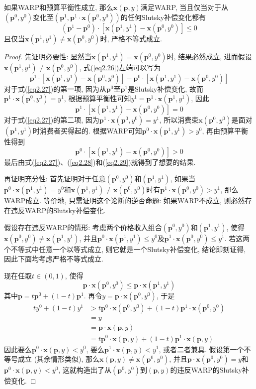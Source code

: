 \documentclass[cn, 12pt, math=mtpro2, bibstyle=apa, blue]{elegantbook}
\newcommand{\p}{\mathbf{p}}
\newcommand{\x}{\mathbf{x}}
\begin{document}
\begin{theorem}\label{thm:thm2.3}
  如果WARP和预算平衡性成立, 那么$\x(\p,y)$满足WARP, 当且仅当对于从$(\p^0,y^0)$变化至$(\p^1,\p^1\cdot \x(\p^0,y^0))$的任何Slutsky补偿变化都有
  \begin{equation}\label{eq2.26}
    (\p^1-\p^0)\cdot[\x(\p^1,y^1)-\x(\p^0,y^0)]\le0
  \end{equation}
  且仅当$\x(\p^1,y^1)\neq \x(\p^0,y^0)$时, 严格不等式成立.
\end{theorem}
\begin{proof}
  先证明必要性: 显然当$\x(\p^1,y^1)=\x(\p^0,y^0)$时, 结果必然成立, 进而假设$\x(\p^1,y^1)\neq \x(\p^0,y^0)$, 式(\ref{eq2.26})左端可以写为
  \begin{equation}\label{eq2.27}
    \p^1\cdot[\x(\p^1,y^1)-\x(\p^0,y^0)]-\p^0\cdot[\x(\p^1,y^1)-\x(\p^0,y^0)]
  \end{equation}
  对于式(\ref{eq2.27})的第一项, 因为从$\p^0$至$\p^1$是Slutsky补偿变化, 故而$\p^1\cdot\x(\p^0,y^0)=y^1$, 根据预算平衡性可知$y^1=\p^1\cdot\x(\p^1,y^1)$, 因此
  \begin{equation}\label{eq2.28}
    \p^1\cdot[\x(\p^1,y^1)-\x(\p^0,y^0)]=0
  \end{equation}
  对于式(\ref{eq2.27})的第二项, 因为$\p^1\cdot\x(\p^0,y^0)=y^1$, 所以消费束$\x(\p^0,y^0)$是面对$(\p^1,y^1)$时消费者买得起的. 根据WARP可知$\p^0\cdot\x(\p^1,y^1)>y^0$, 再由预算平衡性得到
  \begin{equation}\label{eq2.29}
    \p^0\cdot[\x(\p^1,y^1)-\x(\p^0,y^0)]>0
  \end{equation}
  最后由式(\ref{eq2.27})、(\ref{eq2.28})和(\ref{eq2.29})就得到了想要的结果.

  再证明充分性: 首先证明对于任意$(\p^0,y^0)$和$(\p^1,y^1)$, 如果当$\p^0\cdot\x(\p^1,y^1)=y^0$和$\x(\p^1,y^1)\neq \x(\p^0,y^0)$时有$\p^1\cdot\x(\p^0,y^0)>y^1$, 那么WARP成立. 等价地, 只需证明这个论断的逆否命题: 如果WARP不成立, 则必然存在违反WARP的Slutsky补偿变化.

   假设存在违反WARP的情形: 考虑两个价格收入组合$(\p^0,y^0)$和$(\p^1,y^1)$, 使得$\x(\p^0,y^0)\neq \x(\p^1,y^1)$, 并且$\p^0\cdot\x(\p^1,y^1)\leq y^0$及$\p^1\cdot\x(\p^0,y^0)\leq y^1$. 若这两个不等式中任意一个以等式成立, 则它就是一个Slutsky补偿变化, 结论即刻证得, 因此下面均考虑严格不等式成立.

  现在任取$t\in(0,1)$, 使得
  $$\p\cdot\x(\p^0,y^0)\leq \p\cdot\x(\p^1,y^1)$$
  其中$\p=t\p^0+(1-t)\p^1$. 再令$y=\p\cdot\x(\p^0,y^0)$, 于是
  \begin{align*}
  ty^0+(1-t)y^1&>t\p^0\cdot\x(\p^0,y^0)+(1-t)\p^1\cdot\x(\p^0,y^0) \\
  &=y \\
  &=\p\cdot\x(\p,y) \\
  &=t\p^0\cdot\x(\p,y)+(1-t)\p^1\cdot\x(\p,y)
  \end{align*}
  因此要么$\p^0\cdot\x(\p,y)<y^0$, 要么$\p^1\cdot\x(\p,y)<y^1$, 或者二者兼具. 假设第一个不等号成立 (其余情形类似), 那么$\x(\p,y)\neq \x(\p^0,y^0)$, 并且$\p\cdot\x(\p^0,y^0)=y$和$\p^0\cdot\x(\p,y)<y^0$, 这就构造出了从$(\p^0,y^0)$到$(\p,y)$的违反WARP的Slutsky补偿变化.


\end{proof}
\end{document}
